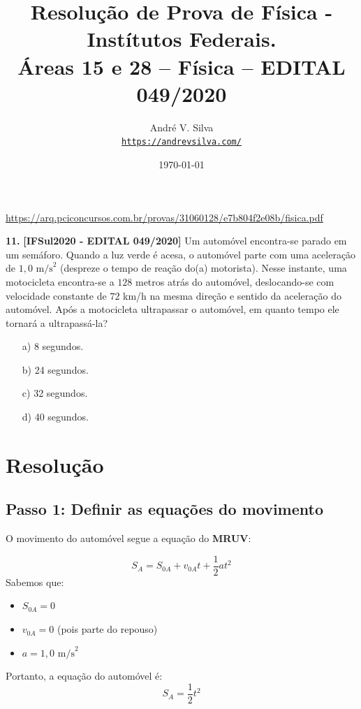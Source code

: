 \documentclass[a4paper,12pt]{article}
\title{Resolu\c{c}\~ao de Prova de F\'isica - Inst\'itutos Federais.\\
Áreas 15 e 28 – Física – EDITAL 049/2020}
\author{Andr\'e V. Silva \\
\href{https://andrevsilva.com/}{\texttt{https://andrevsilva.com/}}}
\date{\today}
\begin{document}
\maketitle

\begin{center}
\url{https://arq.pciconcursos.com.br/provas/31060128/e7b804f2e08b/fisica.pdf}
\end{center}

\textbf{11.} \textbf{[IFSul2020 - EDITAL 049/2020]} Um automóvel encontra-se parado em um semáforo. Quando a luz verde é acesa, o automóvel parte 
com uma aceleração de $1,0 \text{ m/s}^2$ (despreze o tempo de reação do(a) motorista). Nesse instante, 
uma motocicleta encontra-se a $128$ metros atrás do automóvel, deslocando-se com velocidade constante de 
$72$ km/h na mesma direção e sentido da aceleração do automóvel. Após a motocicleta ultrapassar o automóvel, 
em quanto tempo ele tornará a ultrapassá-la?

\begin{itemize}
    \item[a)] 8 segundos.
    \item[b)] 24 segundos.
    \item[c)] 32 segundos.
    \item[d)] 40 segundos.
\end{itemize}

\section*{Resolução}

\subsection*{Passo 1: Definir as equações do movimento}

O movimento do automóvel segue a equação do \textbf{MRUV}:

\begin{equation}
    S_A = S_{0A} + v_{0A} t + \frac{1}{2} a t^2
\end{equation}
Sabemos que:
\begin{itemize}
    \item $S_{0A} = 0$
    \item $v_{0A} = 0$ (pois parte do repouso)
    \item $a = 1,0 \text{ m/s}^2$
\end{itemize}
Portanto, a equação do automóvel é:
\begin{equation}
    S_A = \frac{1}{2} t^2
\end{equation}
\end{document}
